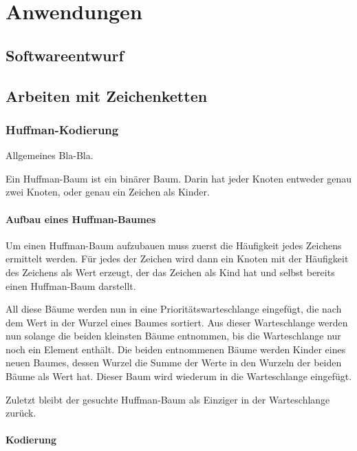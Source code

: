 \section{Anwendungen}
\label{sec:Anwendungen}

\subsection{Softwareentwurf}
\label{subsec:Softwareentwurf}


\subsection{Arbeiten mit Zeichenketten}
\label{subsec:ArbeitenMitZeichenketten}

\subsubsection{Huffman-Kodierung}
\label{subsubsec:HuffmanKodierung}

Allgemeines Bla-Bla.

Ein Huffman-Baum ist ein binärer Baum.
Darin hat jeder Knoten entweder genau zwei Knoten, oder genau ein Zeichen als Kinder.

\paragraph{Aufbau eines Huffman-Baumes}

Um einen Huffman-Baum aufzubauen muss zuerst die Häufigkeit jedes Zeichens ermittelt werden.
Für jedes der Zeichen wird dann ein Knoten mit der Häufigkeit des Zeichens als Wert erzeugt,
der das Zeichen als Kind hat und selbst bereits einen Huffman-Baum darstellt.

All diese Bäume werden nun in eine Prioritätswarteschlange eingefügt,
die nach dem Wert in der Wurzel eines Baumes sortiert.
Aus dieser Warteschlange werden nun solange die beiden kleinsten Bäume entnommen,
bis die Warteschlange nur noch ein Element enthält.
Die beiden entnommenen Bäume werden Kinder eines neuen Baumes,
dessen Wurzel die Summe der Werte in den Wurzeln der beiden Bäume als Wert hat.
Dieser Baum wird wiederum in die Warteschlange eingefügt.

Zuletzt bleibt der gesuchte Huffman-Baum als Einziger in der Warteschlange zurück.

\paragraph{Kodierung}

